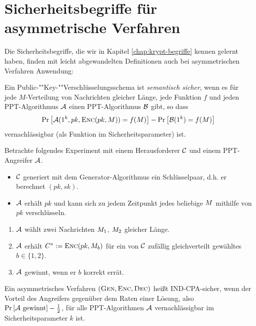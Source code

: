 \section{Sicherheitsbegriffe für asymmetrische Verfahren} Die
Sicherheitsbegriffe, die wir in Kapitel \ref{chap:krypt-begriffe} kennen
gelernt haben, finden mit leicht abgewandelten Definitionen auch bei
asymmetrischen Verfahren Anwendung:

\begin{definition} Ein
  Pub\-lic-""Key-""Ver\-schlüs\-sel\-ungs\-sche\-ma ist \textit{semantisch
    sicher}, wenn es für jede $M$-Verteilung von Nachrichten gleicher Länge,
  jede Funktion $f$ und jeden PPT-Algorithmus $\mathcal{A}$ einen PPT-Algorithmus
  $\mathcal{B}$ gibt, so dass
  \begin{equation*} \Pr\left[\mathcal{A}(1^k, pk, \textsc{Enc}(pk, M)) = f(M)\right] -
    \Pr\left[\mathcal{B}(1^k) = f(M)\right]
  \end{equation*} vernachlässigbar (als Funktion im Sicherheitsparameter)
  ist.
\end{definition}

\begin{definition}\indexINDCPA Betrachte folgendes Experiment mit
  einem Herausforderer $\mathcal{C}$ und einem PPT-Angreifer $\mathcal{A}$.
  \begin{itemize}
  \item $\mathcal{C}$ generiert mit dem Generator-Algorithmus ein Schlüsselpaar,
    d.h. er berechnet $(pk, sk)$.
  \item $\mathcal{A}$ erhält $pk$ und kann sich zu jedem Zeitpunkt jedes
    beliebige $M$ mithilfe von $pk$ verschlüsseln.
  \end{itemize}
  \begin{enumerate}
  \item $\mathcal{A}$ wählt zwei Nachrichten $M_1$, $M_2$ gleicher
    Länge.
  \item $\mathcal{A}$ erhält $C^{*} := \textsc{Enc}(pk, M_{b})$ für ein von
    $\mathcal{C}$ zufällig gleichverteilt gewähltes $b \in \{1, 2\}$.
  \item $\mathcal{A}$ gewinnt, wenn er $b$ korrekt errät.
  \end{enumerate} Ein asymmetrisches Verfahren $(\textsc{Gen}, \textsc{Enc}, \textsc{Dec})$
  heißt IND-CPA-sicher, wenn der Vorteil des Angreifers gegenüber dem
  Raten einer Lösung, also $\Pr \left[ \mathcal{A} \textnormal{ gewinnt} \right] -
  \frac{1}{2}$, für alle PPT-Algorithmen $\mathcal{A}$ vernachlässigbar im
  Sicherheitsparameter $k$ ist.
\end{definition}

